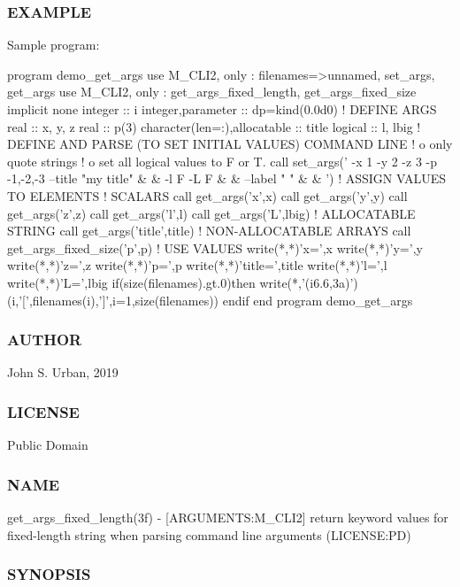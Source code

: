 \subsubsection*{E\+X\+A\+M\+P\+LE}

Sample program\+: \begin{DoxyVerb}program demo_get_args
use M_CLI2,  only : filenames=>unnamed, set_args, get_args
use M_CLI2,  only : get_args_fixed_length, get_args_fixed_size
implicit none
integer                      :: i
integer,parameter            :: dp=kind(0.0d0)
! DEFINE ARGS
real                         :: x, y, z
real                         :: p(3)
character(len=:),allocatable :: title
logical                      :: l, lbig
! DEFINE AND PARSE (TO SET INITIAL VALUES) COMMAND LINE
!   o only quote strings
!   o set all logical values to F or T.
call set_args(' -x 1 -y 2 -z 3 -p -1,-2,-3 --title "my title" &
        & -l F -L F  &
        & --label " " &
        & ')
! ASSIGN VALUES TO ELEMENTS
! SCALARS
call get_args('x',x)
call get_args('y',y)
call get_args('z',z)
call get_args('l',l)
call get_args('L',lbig)
! ALLOCATABLE STRING
call get_args('title',title)
! NON-ALLOCATABLE ARRAYS
call get_args_fixed_size('p',p)
! USE VALUES
write(*,*)'x=',x
write(*,*)'y=',y
write(*,*)'z=',z
write(*,*)'p=',p
write(*,*)'title=',title
write(*,*)'l=',l
write(*,*)'L=',lbig
if(size(filenames).gt.0)then
   write(*,'(i6.6,3a)')(i,'[',filenames(i),']',i=1,size(filenames))
endif
end program demo_get_args
\end{DoxyVerb}
 \subsubsection*{A\+U\+T\+H\+OR}

John S. Urban, 2019 \subsubsection*{L\+I\+C\+E\+N\+SE}

Public Domain \subsubsection*{N\+A\+ME}

get\+\_\+args\+\_\+fixed\+\_\+length(3f) -\/ \mbox{[}A\+R\+G\+U\+M\+E\+N\+TS\+:M\+\_\+\+C\+L\+I2\mbox{]} return keyword values for fixed-\/length string when parsing command line arguments (L\+I\+C\+E\+N\+SE\+:PD)

\subsubsection*{S\+Y\+N\+O\+P\+S\+IS}

